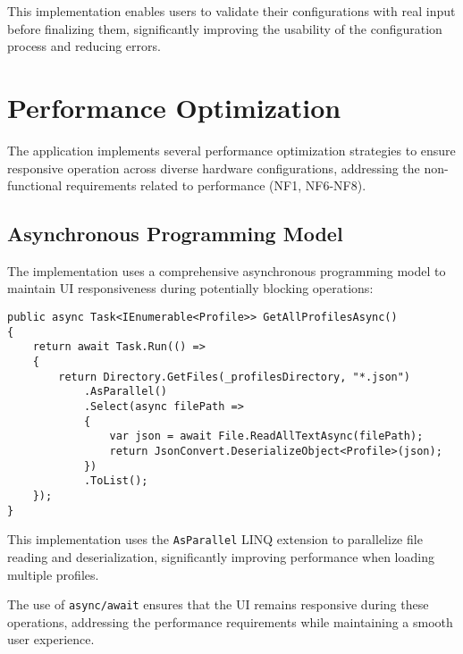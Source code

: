 This implementation enables users to validate their configurations with real input before finalizing them, significantly improving the usability of the configuration process and reducing errors.

\section{Performance Optimization}
The application implements several performance optimization strategies to ensure responsive operation across diverse hardware configurations, addressing the non-functional requirements related to performance (NF1, NF6-NF8).

\subsection{Asynchronous Programming Model}
The implementation uses a comprehensive asynchronous programming model to maintain UI responsiveness during potentially blocking operations:

\begin{verbatim}
public async Task<IEnumerable<Profile>> GetAllProfilesAsync()
{
    return await Task.Run(() =>
    {
        return Directory.GetFiles(_profilesDirectory, "*.json")
            .AsParallel()
            .Select(async filePath =>
            {
                var json = await File.ReadAllTextAsync(filePath);
                return JsonConvert.DeserializeObject<Profile>(json);
            })
            .ToList();
    });
}
\end{verbatim}

This implementation uses the \texttt{AsParallel} LINQ extension to parallelize file reading and deserialization, significantly improving performance when loading multiple profiles.

The use of \texttt{async/await} ensures that the UI remains responsive during these operations, addressing the performance requirements while maintaining a smooth user experience.
